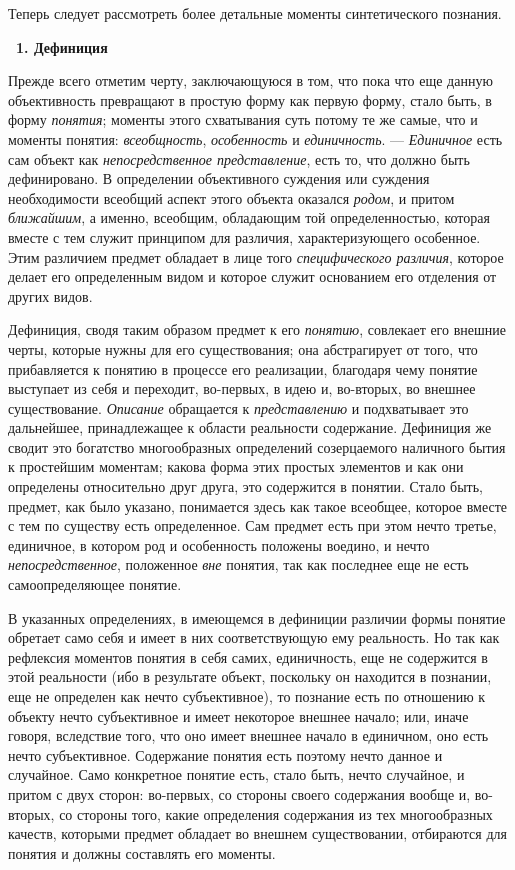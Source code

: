 \documentclass[twoside]{article}
\begin{document}
{Теперь следует рассмотреть более детальные моменты
синтетического познания.}

{\centering\bfseries\ 1. Дефиниция \par}

Прежде всего отметим черту, заключающуюся в том, что пока что
еще данную объективность превращают в простую форму как первую форму, стало
быть, в форму {\em понятия};
моменты этого схватывания суть потому те же самые, что и
моменты понятия: {\em всеобщность},
{\em особенность} и
{\em единичность}. —
{\em Единичное} есть сам
объект как {\em непосредственное
представление}, есть то, что должно быть дефинировано. В
определении объективного суждения или суждения необходимости всеобщий
аспект этого объекта оказался
{\em родом}, и притом
{\em ближайшим}, а
именно, всеобщим, обладающим той определенностью, которая вместе с тем
служит принципом для различия, характеризующего особенное. Этим различием
предмет обладает в лице того
{\em специфического различия},
которое делает его определенным видом и которое служит
основанием его отделения от других видов.

Дефиниция, сводя таким образом предмет к его
{\em понятию}, совлекает
его внешние черты, которые нужны для его существования; она абстрагирует от
того, что прибавляется к понятию в процессе его реализации, благодаря чему
понятие выступает из себя и переходит, во-первых, в идею и, во-вторых, во
внешнее существование. {\em Описание}
обращается к
{\em представлению} и
подхватывает это дальнейшее, принадлежащее к области реальности содержание.
Дефиниция же сводит это богатство многообразных определений созерцаемого
наличного бытия к простейшим моментам; какова форма этих простых элементов
и как они определены относительно друг друга, это содержится в понятии.
Стало быть, предмет, как было указано, понимается здесь как такое всеобщее,
которое вместе с тем по существу есть определенное. Сам предмет есть при
этом нечто третье, единичное, в котором род и особенность
положены воедино, и нечто
{\em непосредственное},
положенное {\em вне}
понятия, так как последнее еще не есть самоопределяющее
понятие.

В указанных определениях, в имеющемся в дефиниции различии
формы понятие обретает само себя и имеет в них соответствующую ему
реальность. Но так как рефлексия моментов понятия в себя самих,
единичность, еще не содержится в этой реальности (ибо в результате объект,
поскольку он находится в познании, еще не определен как нечто
субъективное), то познание есть по отношению к объекту нечто субъективное и
имеет некоторое внешнее начало; или, иначе говоря, вследствие того, что оно
имеет внешнее начало в единичном, оно есть нечто субъективное. Содержание
понятия есть поэтому нечто данное и случайное. Само конкретное понятие
есть, стало быть, нечто случайное, и притом с двух сторон: во-первых, со
стороны своего содержания вообще и, во-вторых, со стороны того, какие
определения содержания из тех многообразных качеств, которыми предмет
обладает во внешнем существовании, отбираются для понятия и должны
составлять его моменты.
\end{document}
